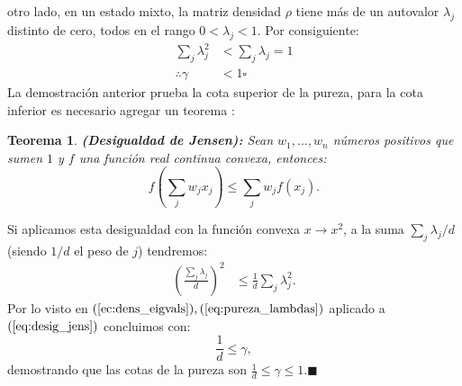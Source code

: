 \documentclass[letterpaper,12pt]{thesisECFM}
\theoremstyle{plain}
\newtheorem{thm}{Teorema}[section]
\theoremstyle{definition}
\theoremstyle{definition}
\theoremstyle{remark}
\newcommand{\1}{\mathbb{1}}
\begin{document}
otro lado, en un estado mixto, la matriz densidad $\rho$ tiene más de un
autovalor $\lambda_j$ distinto de cero, todos en el rango $0 < \lambda_j < 1$.
Por consiguiente:
    \begin{align}
        \sum_j \lambda_j^2 & < \sum_j \lambda_j =1 \\
        \therefore \gamma & < 1 \square
     \end{align}
La demostración anterior prueba la cota superior de la pureza, para la cota
inferior es necesario agregar un teorema \cite{jensen_wolfram}:
\begin{thm}
\textbf{(Desigualdad de Jensen):} \label{thm:jensen}  Sean $w_1,...,w_n$
números positivos que sumen $1$ y $f$ una función real continua convexa,
entonces:
\begin{equation}
    f \left( \sum_j w_j x_j  \right) \leq \sum_j w_j f(x_j).
\end{equation}
\end{thm}

Si aplicamos esta desigualdad con la función convexa $x \xrightarrow{}x^2$,  a
la suma $\sum_j \lambda_j /d$ (siendo $1/d$ el peso de $j$) tendremos:
    \begin{align}
    \label{eq:desig_jens}
        \left( \frac{\sum_j  \lambda_j}{d}\right)^2  & \leq \frac{1}{d} \sum_j \lambda_j^2.
    \end{align}
Por lo visto en $(\ref{ec:dens_eigvals}),(\ref{eq:pureza_lambdas})$ aplicado a $(\ref{eq:desig_jens})$ concluimos con:
\begin{equation}
    \frac{1}{d} \leq \gamma, 
\end{equation}
demostrando que las cotas de la pureza son $\frac{1}{d} \leq \gamma \leq
1$.$\blacksquare$ 
\end{document}
